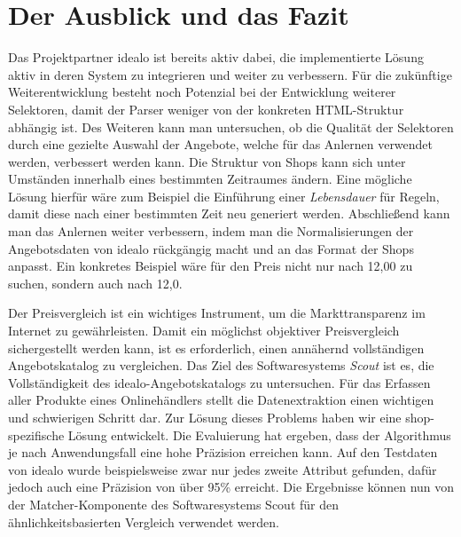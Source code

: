 \section{Der Ausblick und das Fazit}
\label{sec:abschluss}

Das Projektpartner idealo ist bereits aktiv dabei, die implementierte Lösung aktiv in deren System zu
integrieren und weiter zu verbessern.
Für die zukünftige Weiterentwicklung besteht noch Potenzial bei der Entwicklung weiterer Selektoren, damit der Parser
weniger von der konkreten HTML-Struktur abhängig ist.
Des Weiteren kann man untersuchen, ob die Qualität der Selektoren durch eine gezielte Auswahl der Angebote, welche
für das Anlernen verwendet werden, verbessert werden kann.
Die Struktur von Shops kann sich unter Umständen innerhalb eines bestimmten Zeitraumes ändern.
Eine mögliche Lösung hierfür wäre zum Beispiel die Einführung einer \textit{Lebensdauer} für Regeln, damit diese nach
einer bestimmten Zeit neu generiert werden.
Abschließend kann man das Anlernen weiter verbessern, indem man die Normalisierungen der Angebotsdaten von idealo
rückgängig macht und an das Format der Shops anpasst.
Ein konkretes Beispiel wäre für den Preis nicht nur nach 12,00 zu suchen, sondern auch nach 12,0.

Der Preisvergleich ist ein wichtiges Instrument, um die Markttransparenz im Internet zu gewährleisten.
Damit ein möglichst objektiver Preisvergleich sichergestellt werden kann, ist es erforderlich, einen annähernd
vollständigen Angebotskatalog zu vergleichen.
Das Ziel des Softwaresystems \textit{Scout} ist es, die Vollständigkeit des idealo-Angebotskatalogs zu untersuchen.
Für das Erfassen aller Produkte eines Onlinehändlers stellt die Datenextraktion einen wichtigen und schwierigen
Schritt dar.
Zur Lösung dieses Problems haben wir eine shop-spezifische Lösung entwickelt.
Die Evaluierung hat ergeben, dass der Algorithmus je nach Anwendungsfall eine hohe Präzision erreichen kann.
Auf den Testdaten von idealo wurde beispielsweise zwar nur jedes zweite Attribut gefunden, dafür jedoch auch eine
Präzision von über 95\% erreicht.
Die Ergebnisse können nun von der Matcher-Komponente des Softwaresystems Scout für den ähnlichkeitsbasierten
Vergleich verwendet werden.